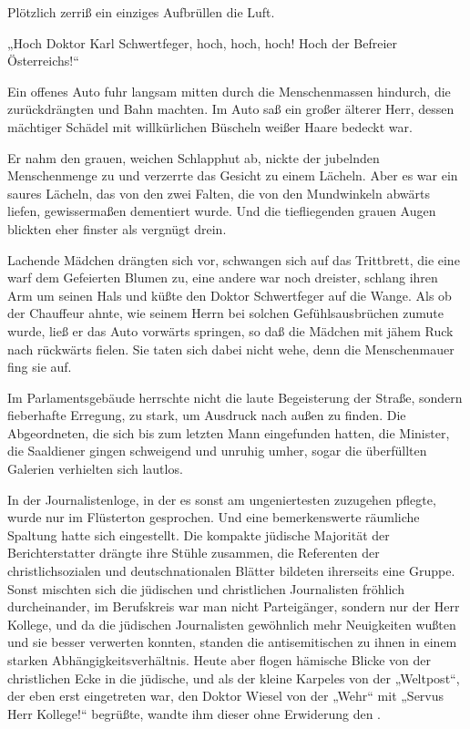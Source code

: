 Plötzlich zerriß ein einziges Aufbrüllen die Luft.

„Hoch Doktor Karl Schwertfeger, hoch, hoch, hoch! Hoch der Befreier
Österreichs!“

Ein offenes Auto fuhr langsam mitten durch die Menschenmassen
hindurch, die zurückdrängten und Bahn machten. Im Auto saß ein
großer älterer Herr, dessen mächtiger Schädel mit willkürlichen
Büscheln weißer Haare bedeckt war.

Er nahm den grauen, weichen Schlapphut ab, nickte der jubelnden
Menschenmenge zu und verzerrte das Gesicht zu einem Lächeln. Aber
es war ein saures Lächeln, das von den zwei Falten, die von den
Mundwinkeln abwärts liefen, gewissermaßen dementiert wurde. Und die
tiefliegenden grauen Augen blickten eher finster als vergnügt
drein.

Lachende Mädchen drängten sich vor, schwangen sich auf das
Trittbrett, die eine warf dem Gefeierten Blumen zu, eine andere war
noch dreister, schlang ihren Arm um seinen Hals und küßte den
Doktor Schwertfeger auf die Wange. Als ob der Chauffeur ahnte, wie
seinem Herrn bei solchen Gefühlsausbrüchen zumute wurde, ließ er
das Auto vorwärts springen, so daß die Mädchen mit jähem Ruck nach
rückwärts fielen. Sie taten sich dabei nicht wehe, denn die
Menschenmauer fing sie auf.

Im Parlamentsgebäude herrschte nicht die laute Begeisterung der
Straße, sondern fieberhafte Erregung, zu stark, um Ausdruck nach
außen zu finden. Die Abgeordneten, die sich bis zum letzten Mann
eingefunden hatten, die Minister, die Saaldiener gingen schweigend
und unruhig umher, sogar die überfüllten Galerien verhielten sich
lautlos.

In der Journalistenloge, in der es sonst am
ungeniertesten zuzugehen pflegte, wurde nur im Flüsterton
gesprochen. Und eine bemerkenswerte räumliche Spaltung hatte sich
eingestellt. Die kompakte jüdische Majorität der Berichterstatter
drängte ihre Stühle zusammen, die Referenten der christlichsozialen
und deutschnationalen Blätter bildeten ihrerseits eine Gruppe.
Sonst mischten sich die jüdischen und christlichen Journalisten
fröhlich durcheinander, im Berufskreis war man nicht Parteigänger,
sondern nur der Herr Kollege, und da die jüdischen Journalisten
gewöhnlich mehr Neuigkeiten wußten und sie besser verwerten
konnten, standen die antisemitischen zu ihnen in einem starken
Abhängigkeitsverhältnis. Heute aber flogen hämische Blicke von der
christlichen Ecke in die jüdische, und als der kleine Karpeles von
der „Weltpost“, der eben erst eingetreten war, den Doktor Wiesel
von der „Wehr“ mit „Servus Herr Kollege!“ begrüßte, wandte ihm
dieser ohne Erwiderung den .

